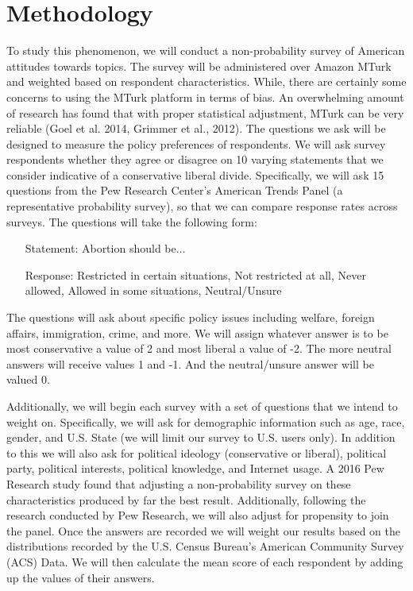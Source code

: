 \documentclass[12pt]{article}
\begin{document}
\section{Methodology}

To study this phenomenon, we will conduct a non-probability survey of American attitudes towards topics. The survey will be administered over Amazon MTurk and weighted based on respondent characteristics. While, there are certainly some concerns to using the MTurk platform in terms of bias. An overwhelming amount of research has found that with proper statistical adjustment, MTurk can be very reliable (Goel et al. 2014, Grimmer et al., 2012). The questions we ask will be designed to measure the policy preferences of respondents.  We will ask survey respondents whether they agree or disagree on 10 varying statements that we consider indicative of a conservative liberal divide. Specifically, we will ask 15 questions from the Pew Research Center’s American Trends Panel (a representative probability survey), so that we can compare response rates across surveys. The questions will take the following form:

\begin{enumerate}[leftmargin=*]
	\item[Statement:] Abortion should be$\dots$
	\item[Response:] Restricted in certain situations, Not restricted at all, Never allowed, Allowed in some situations, Neutral/Unsure
\end{enumerate}
The questions will ask about specific policy issues including welfare, foreign affairs, immigration, crime, and more. We will assign whatever answer is to be most conservative a value of 2 and most liberal a value of -2. The more neutral answers will receive values 1 and -1. And the neutral/unsure answer will be valued 0.

Additionally, we will begin each survey with a set of questions that we intend to weight on. Specifically, we will ask for demographic information such as age, race, gender, and U.S. State (we will limit our survey to U.S. users only). In addition to this we will also ask for political ideology (conservative or liberal), political party, political interests, political knowledge, and Internet usage. A 2016 Pew Research study found that adjusting a non-probability survey on these characteristics produced by far the best result. Additionally, following the research conducted by Pew Research, we will also adjust for propensity to join the panel. Once the answers are recorded we will weight our results based on the distributions recorded by the U.S. Census Bureau’s American Community Survey (ACS) Data.  We will then calculate the mean score of each respondent by adding up the values of their answers. 
\end{document}
